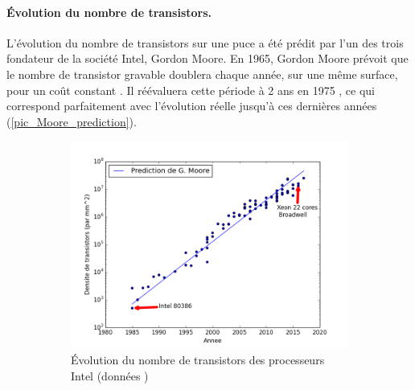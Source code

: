 \paragraph{Évolution du nombre de transistors.}
L'évolution du nombre de transistors sur une puce a été prédit par l'un des trois fondateur de la société Intel, Gordon Moore. En 1965, Gordon Moore prévoit que le nombre de transistor gravable doublera chaque année, sur une même surface, pour un coût constant \cite{Moore1998}. Il réévaluera cette période à 2 ans en 1975 \cite{Moore75}, ce qui correspond parfaitement avec l'évolution réelle jusqu'à ces dernières années (\autoref{pic_Moore_prediction}). 



\begin{figure}
    \begin{subfigure}[]{0.48\linewidth}\centering
        \vspace{1cm}
        \includegraphics[width=\linewidth]{images/Chapitre1/Moore_prediction.png}
        \caption{\label{pic_Moore_prediction} Évolution du nombre de transistors des processeurs Intel (données \cite{Wikipedia2019Transistor})}
    \end{subfigure}
    ~ %
    \begin{subfigure}[]{0.48\linewidth}\centering

\end{subfigure}
\end{figure}

